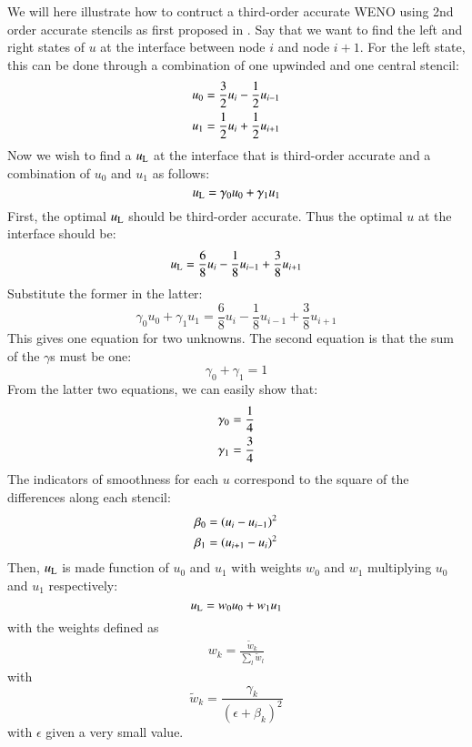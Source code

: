 \documentclass{warpdoc}
\newcommand{\alb}{\vspace{0.1cm}\\} %
\begin{document}
We will here illustrate how to contruct a third-order accurate WENO using 2nd order accurate stencils as first proposed in \cite{jcp:1994:liu}. 
Say that we want to find the left and right states of $u$ at the interface between node $i$ and node $i+1$. For the left state, this can be done through a combination of one upwinded and one central stencil:
%
\begin{align}
  u_0&=\frac{3}{2} u_{i} -\frac{1}{2} u_{i-1} \alb
  u_1&=\frac{1}{2} u_i + \frac{1}{2} u_{i+1}
\end{align}
%
Now we wish to find a $u_{\rm L}$ at the interface that is third-order accurate and a combination of $u_0$ and $u_1$ as follows:
%
\begin{equation}
  u_{\rm L}=\gamma_0 u_0 + \gamma_1 u_1
\end{equation}
%
First, the optimal $u_{\rm L}$ should be third-order accurate. Thus the optimal $u$ at the interface should be:
%
\begin{equation}
u_{\rm L}=\frac{6}{8} u_i - \frac{1}{8} u_{i-1} + \frac{3}{8} u_{i+1}
\end{equation}
%
Substitute the former in the latter:
%
\begin{equation}
\gamma_0 u_0 + \gamma_1 u_1 
 = 
\frac{6}{8} u_i - \frac{1}{8} u_{i-1} + \frac{3}{8} u_{i+1}
\end{equation}
%
This gives one equation for two unknowns. The second equation is that the sum of the $\gamma$s must be one:
%
\begin{equation}
\gamma_0+\gamma_1=1
\end{equation}
%
From the latter two equations, we can easily show that:
%
\begin{align}
\gamma_0&=\frac{1}{4}\alb
\gamma_1&=\frac{3}{4}
\end{align}
%
The indicators of smoothness for each $u$ correspond to the square of the differences along each stencil:
%
\begin{align}
\beta_0&=(u_i-u_{i-1})^2 \alb
\beta_1&=(u_{i+1}-u_{i})^2
\end{align}
%
Then, $u_{\rm L}$ is made function of $u_0$ and $u_1$ with weights $w_0$ and $w_1$ multiplying $u_0$ and $u_1$ respectively:
%
\begin{equation}
 u_{\rm L}=w_0 u_0 + w_1 u_1
\end{equation}
%
with the weights defined as
%
\begin{align}
w_k = \frac{\tilde{w}_k}{\sum_l \tilde{w}_l} 
\end{align}
%
with
%
\begin{equation}
 \tilde{w}_k=\frac{\gamma_k}{(\epsilon + \beta_k)^2}
\end{equation}
%
with $\epsilon$ given a very small value.







\appendix


  
  
\end{document}
